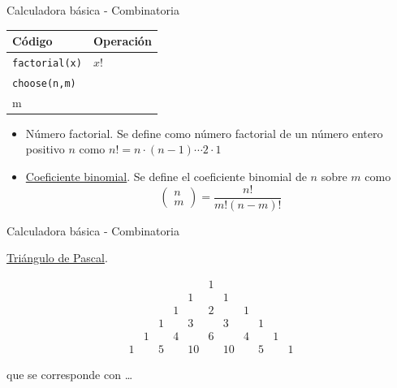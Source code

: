 \documentclass[
  ignorenonframetext,
]{beamer}
\providecommand{\tightlist}{%
  \setlength{\itemsep}{0pt}\setlength{\parskip}{0pt}}
\begin{document}
\begin{frame}[fragile]{Calculadora básica - Combinatoria}
\protect\hypertarget{calculadora-buxe1sica---combinatoria}{}

\begin{longtable}[]{@{}ll@{}}
\toprule
Código & Operación\tabularnewline
\midrule
\endhead
\texttt{factorial(x)} &
\href{https://es.wikipedia.org/wiki/Factorial}{\(x!\)}\tabularnewline
\texttt{choose(n,m)} &
\(\begin{pmatrix}n\\ m\end{pmatrix}\)\tabularnewline
\bottomrule
\end{longtable}

\vspace{0.2cm}

\begin{itemize}
\tightlist
\item
  Número factorial. Se define como número factorial de un número entero
  positivo \(n\) como \(n!=n\cdot(n-1)\cdots 2\cdot 1\)
\item
  \href{https://es.wikipedia.org/wiki/Coeficiente_binomial}{Coeficiente
  binomial}. Se define el coeficiente binomial de \(n\) sobre \(m\) como
  \[\begin{pmatrix}n\\ m\end{pmatrix}=\frac{n!}{m!(n-m)!}\]
\end{itemize}

\end{frame}

\begin{frame}{Calculadora básica - Combinatoria}
\protect\hypertarget{calculadora-buxe1sica---combinatoria-1}{}

\href{https://es.wikipedia.org/wiki/Triángulo_de_Pascal}{Triángulo de
Pascal}.

\usepackage{mathdots}
\usepackage{yhmath}
\usepackage{mathdots}
\usepackage{MnSymbol}

\[\begin{matrix}
&&&&&1&&&&&\\
&&&&1&&1&&&&\\
&&&1&&2&&1&&&\\
&&1&&3&&3&&1&&\\
&1&&4&&6&&4&&1&\\
1&&5&&10&&10&&5&&1\end{matrix}\]

que se corresponde con \ldots{}

\end{frame}
\end{document}

